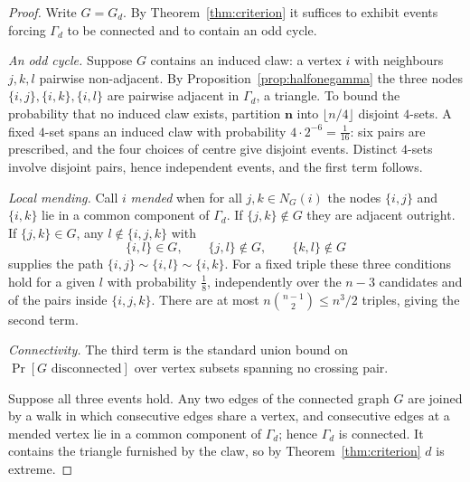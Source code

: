 \documentclass[11pt]{article}
\theoremstyle{definition}
\theoremstyle{remark}
\begin{document}
\begin{proof}
Write $G=G_d$. By Theorem~\ref{thm:criterion} it suffices to exhibit events forcing
$\Gamma_d$ to be connected and to contain an odd cycle.

\emph{An odd cycle.} Suppose $G$ contains an induced claw: a vertex $i$ with neighbours
$j,k,l$ pairwise non-adjacent. By Proposition~\ref{prop:halfonegamma} the three nodes
$\{i,j\},\{i,k\},\{i,l\}$ are pairwise adjacent in $\Gamma_d$, a triangle. To bound the
probability that no induced claw exists, partition $\mathbf n$ into $\lfloor n/4\rfloor$
disjoint $4$-sets. A fixed $4$-set spans an induced claw with probability
$4\cdot2^{-6}=\tfrac1{16}$: six pairs are prescribed, and the four choices of centre give
disjoint events. Distinct $4$-sets involve disjoint pairs, hence independent events, and
the first term follows.

\emph{Local mending.} Call $i$ \emph{mended} when for all $j,k\in N_G(i)$ the nodes
$\{i,j\}$ and $\{i,k\}$ lie in a common component of $\Gamma_d$. If $\{j,k\}\notin G$ they
are adjacent outright. If $\{j,k\}\in G$, any $l\notin\{i,j,k\}$ with
\[
\{i,l\}\in G,\qquad \{j,l\}\notin G,\qquad\{k,l\}\notin G
\]
supplies the path $\{i,j\}\sim\{i,l\}\sim\{i,k\}$. For a fixed triple these three
conditions hold for a given $l$ with probability $\tfrac18$, independently over the $n-3$
candidates and of the pairs inside $\{i,j,k\}$. There are at most $n\binom{n-1}2\leq n^3/2$
triples, giving the second term.

\emph{Connectivity.} The third term is the standard union bound on
$\Pr[G\text{ disconnected}]$ over vertex subsets spanning no crossing pair.

Suppose all three events hold. Any two edges of the connected graph $G$ are joined by a
walk in which consecutive edges share a vertex, and consecutive edges at a mended vertex
lie in a common component of $\Gamma_d$; hence $\Gamma_d$ is connected. It contains the
triangle furnished by the claw, so by Theorem~\ref{thm:criterion} $d$ is extreme.
\end{proof}
\end{document}

